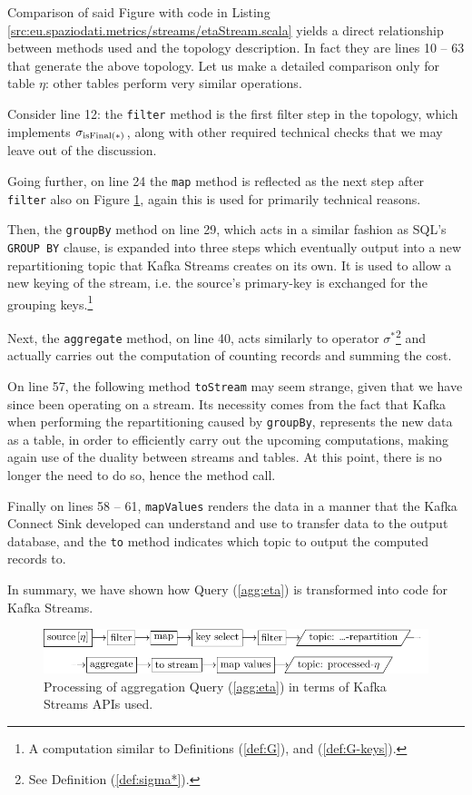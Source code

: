 Comparison of said Figure with code in Listing \ref{src:eu.spaziodati.metrics/streams/etaStream.scala} yields a direct relationship between methods used and the topology description.
In fact they are lines 10 -- 63 that generate the above topology.
Let us make a detailed comparison only for table $\eta$: other tables perform very similar operations.

Consider line 12: the \texttt{filter} method is the first filter step in the topology, which implements $\sigma_{\text{isFinal}\left({*}\right)}$, along with other required technical checks that we may leave out of the discussion.

Going further, on line 24 the \texttt{map} method is reflected as the next step after \texttt{filter} also on Figure \ref{fig:aggregation-processing}, again this is used for primarily technical reasons.

Then, the \texttt{groupBy} method on line 29, which acts in a similar fashion as SQL's \texttt{GROUP BY} clause, is expanded into three steps which eventually output into a new repartitioning topic that Kafka Streams creates on its own.
It is used to allow a new keying of the stream, i.e. the source's primary-key is exchanged for the grouping keys.\footnote{%
	A computation similar to Definitions (\ref{def:G}), and (\ref{def:G-keys}).
}

Next, the \texttt{aggregate} method, on line 40, acts similarly to operator $\sigma^*$\footnote{%
	See Definition (\ref{def:sigma*}).
} and actually carries out the computation of counting records and summing the cost.

On line 57, the following method \texttt{toStream} may seem strange, given that we have since been operating on a stream.
Its necessity comes from the fact that Kafka when performing the repartitioning caused by \texttt{groupBy}, represents the new data as a table, in order to efficiently carry out the upcoming computations, making again use of the duality between streams and tables.
At this point, there is no longer the need to do so, hence the method call.

Finally on lines 58 -- 61, \texttt{mapValues} renders the data in a manner that the Kafka Connect Sink developed can understand and use to transfer data to the output database, and the \texttt{to} method indicates which topic to output the computed records to.

In summary, we have shown how Query (\ref{agg:eta}) is transformed into code for Kafka Streams.

\begin{figure}
	\centering
	\includegraphics[width=\linewidth]{figures/data/aggregation-processing}
	\caption{Processing of aggregation Query (\ref{agg:eta}) in terms of Kafka Streams APIs used.}
	\label{fig:aggregation-processing}
\end{figure}

